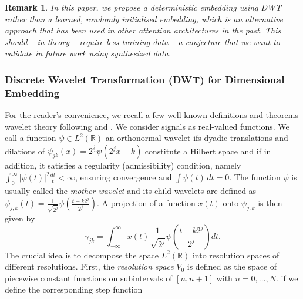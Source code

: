 \documentclass{ieeeaccess}
\newcommand{\todo}[1]{\textbf{\ \textcolor{red}{#1}}}
\newtheorem{remark}{Remark}
\begin{document}
\begin{remark} In this paper, we propose a deterministic embedding using DWT rather than a learned, randomly initialised embedding, which is an alternative approach that has been used in other attention architectures in the past. This should -- in theory -- require less training data -- a conjecture that we want to validate in future work using synthesized data.
\end{remark} 

\subsubsection{Discrete Wavelet Transformation (DWT) for Dimensional Embedding}
For the reader's convenience, we recall a few well-known definitions and theorems wavelet theory following \cite{Daubechies} and \cite{MallatEtAl}.
We consider signals as real-valued functions. We call a function $\psi\in L^2(\mathbb{R})$ an orthonormal wavelet ifs dyadic translations and dilations of $\psi _{{jk}}(x)=2^{{\frac  {j}{2}}}\psi \left(2^{j}x-k\right)$ constitute a Hilbert space and if in addition, it satisfies a regularity (admissibility) condition, namely $\int_0^\infty |\psi(t)|^2 \frac{dt}{t}<\infty$, ensuring convergence and $\int \psi(t)\, dt =0$. The function  $\psi$ is usually called the \emph{mother wavelet} and its child wavelets are defined as 
$\psi_{j,k}(t)= \frac{1}{\sqrt{2^j}} \psi \left( \frac{t - k 2^j}{2^j} \right)$. A projection of a function $x(t)$ onto $\psi_{j,k}$ is then given by
\begin{equation}
 \gamma_{jk} = \int_{-\infty}^{\infty} x(t)  \frac{1}{\sqrt{2^j}} \psi \left( \frac{t - k 2^j}{2^j} \right) dt.
\end{equation}
The crucial idea is to decompose the space $L^2(\mathbb{R})$ into resolution spaces of different resolutions. First, the \emph{resolution space} $V_0$ is defined as the space of piecewise constant functions on subintervals of $[n, n+1]$ with $n=0,\ldots, N$. if we define the corresponding step function  
\end{document}
